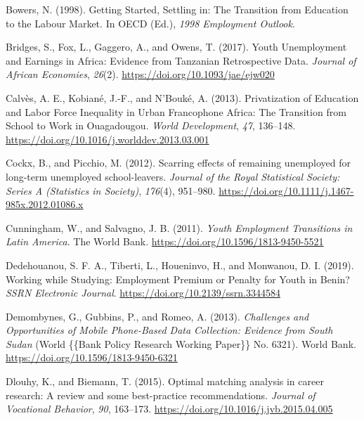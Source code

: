 \documentclass[
  11pt,
a4paper
]{article}
\newlength{\cslhangindent}
\newenvironment{CSLReferences}[2] %
 {%
  \setlength{\parindent}{0pt}
  \ifodd #1 \everypar{\setlength{\hangindent}{\cslhangindent}}\ignorespaces\fi
  \ifnum #2 > 0
  \setlength{\parskip}{#2\baselineskip}
  \fi
 }%
 {}
\begin{document}
\begin{CSLReferences}{1}{0}
\leavevmode{}%
Bowers, N. (1998). Getting {Started}, {Settling} in: {The Transition} from {Education} to the {Labour Market}. In OECD (Ed.), \emph{1998 {Employment Outlook}}.

\leavevmode{}%
Bridges, S., Fox, L., Gaggero, A., and Owens, T. (2017). Youth {Unemployment} and {Earnings} in {Africa}: {Evidence} from {Tanzanian Retrospective Data}. \emph{Journal of African Economies}, \emph{26}(2). \url{https://doi.org/10.1093/jae/ejw020}

\leavevmode{}%
Calvès, A. E., Kobiané, J.-F., and N'Bouké, A. (2013). Privatization of {Education} and {Labor Force Inequality} in {Urban Francophone Africa}: {The Transition} from {School} to {Work} in {Ouagadougou}. \emph{World Development}, \emph{47}, 136--148. \url{https://doi.org/10.1016/j.worlddev.2013.03.001}

\leavevmode{}%
Cockx, B., and Picchio, M. (2012). Scarring effects of remaining unemployed for long-term unemployed school-leavers. \emph{Journal of the Royal Statistical Society: Series A (Statistics in Society)}, \emph{176}(4), 951--980. \url{https://doi.org/10.1111/j.1467-985x.2012.01086.x}

\leavevmode{}%
Cunningham, W., and Salvagno, J. B. (2011). \emph{Youth {Employment Transitions} in {Latin America}}. {The World Bank}. \url{https://doi.org/10.1596/1813-9450-5521}

\leavevmode{}%
Dedehouanou, S. F. A., Tiberti, L., Houeninvo, H., and Monwanou, D. I. (2019). Working while {Studying}: {Employment Premium} or {Penalty} for {Youth} in {Benin}? \emph{SSRN Electronic Journal}. \url{https://doi.org/10.2139/ssrn.3344584}

\leavevmode{}%
Demombynes, G., Gubbins, P., and Romeo, A. (2013). \emph{Challenges and {Opportunities} of {Mobile Phone-Based Data Collection}: {Evidence} from {South Sudan}} (World \{\{Bank Policy Research Working Paper\}\} No. 6321). {World Bank}. \url{https://doi.org/10.1596/1813-9450-6321}

\leavevmode{}%
Dlouhy, K., and Biemann, T. (2015). Optimal matching analysis in career research: {A} review and some best-practice recommendations. \emph{Journal of Vocational Behavior}, \emph{90}, 163--173. \url{https://doi.org/10.1016/j.jvb.2015.04.005}


\end{CSLReferences}
\end{document}
